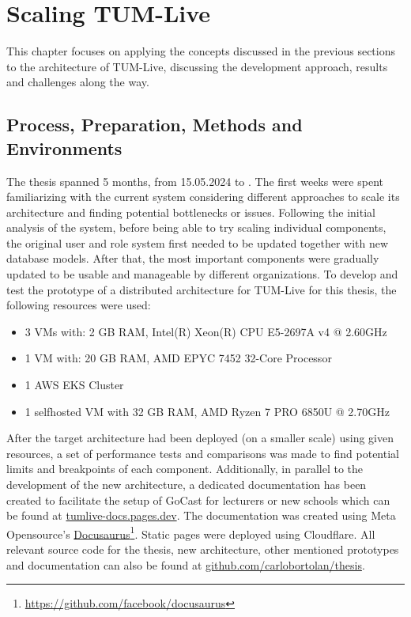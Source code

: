 
\chapter{Scaling TUM-Live}\label{chapter:scaling_tumlive}

This chapter focuses on applying the concepts discussed in the previous sections to the architecture of TUM-Live, discussing the development approach, results and challenges along the way. 

\section{Process, Preparation, Methods and Environments}

The thesis spanned 5 months, from 15.05.2024 to \getSubmissionDate{}. The first weeks were spent familiarizing with the current system considering different approaches to scale its architecture and finding potential bottlenecks or issues. Following the initial analysis of the system, before being able to try scaling individual components, the original user and role system first needed to be updated together with new database models. After that, the most important components were gradually updated to be usable and manageable by different organizations. 
To develop and test the prototype of a distributed architecture for TUM-Live for this thesis, the following resources were used:
\begin{itemize}
    \item 3 \ac{VM}s with: 2 GB RAM, Intel(R) Xeon(R) CPU E5-2697A v4 @ 2.60GHz
    \item 1 \ac{VM} with: 20 GB RAM, AMD EPYC 7452 32-Core Processor
    \item 1 \ac{AWS} \ac{EKS} Cluster
    \item 1 selfhosted \ac{VM} with 32 GB RAM, AMD Ryzen 7 PRO 6850U @ 2.70GHz
\end{itemize}

After the target architecture had been deployed (on a smaller scale) using given resources, a set of performance tests and comparisons was made to find potential limits and breakpoints of each component. 
Additionally, in parallel to the development of the new architecture, a dedicated documentation has been created to facilitate the setup of GoCast for lecturers or new schools which can be found at \href{https://tumlive-docs.pages.dev/}{tumlive-docs.pages.dev}. The documentation was created using Meta Opensource's \href{https://github.com/facebook/docusaurus}{Docusaurus}\footnote{\url{https://github.com/facebook/docusaurus}}. Static pages were deployed using Cloudflare.
All relevant source code for the thesis, new architecture, other mentioned prototypes and documentation can also be found at \href{https://github.com/carlobortolan/thesis}{github.com/carlobortolan/thesis}.

